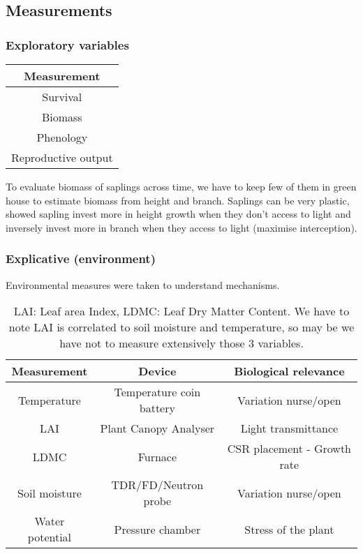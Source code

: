 \documentclass[12pt]{article} %
\begin{document}
\subsection{Measurements}

\subsubsection{Exploratory variables}
\begin{table}[h]
\begin{center}
\begin{tabular}{c}
Measurement \\ 
\hline
Survival \\ 
Biomass \\ 
Phenology \\ 
Reproductive output \\
\hline 
\end{tabular}
\end{center}
\end{table} 
To evaluate biomass of saplings across time, we have to keep few of them in green house to estimate biomass from height and branch. Saplings can be very plastic, \citet{Bonser1994} showed sapling invest more in height growth when they don't access to light and inversely invest more in branch when they access to light (maximise interception). 

\subsubsection{Explicative (environment)}
Environmental measures were taken to understand mechanisms.
\begin{table}[h]
\begin{center}
\begin{tabular}{ccc}
Measurement & Device & Biological relevance\\
\hline
Temperature & Temperature coin battery & Variation nurse/open\\
LAI & Plant Canopy Analyser & Light transmittance\\
LDMC & Furnace & CSR placement - Growth rate\\
Soil moisture & TDR/FD/Neutron probe & Variation nurse/open\\
Water potential & Pressure chamber & Stress of the plant\\
\hline 
\end{tabular}
\caption{LAI: Leaf area Index, LDMC: Leaf Dry Matter Content. We have to note LAI is correlated to soil moisture and temperature, so may be we have not to measure extensively those 3 variables.}
\end{center}
\end{table}
\end{document}
